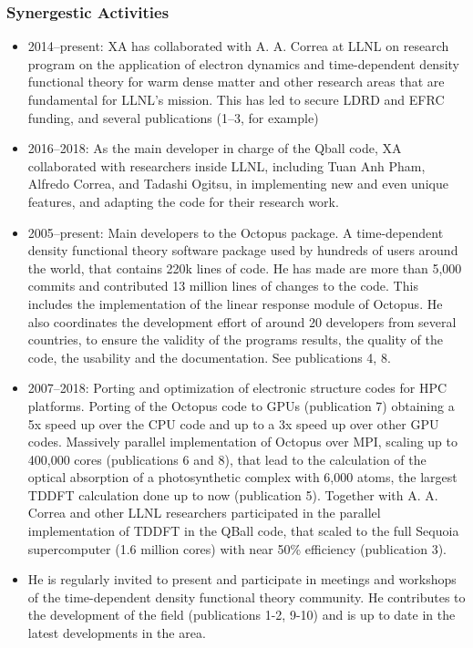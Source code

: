 \subsubsection*{Synergestic Activities}

\begin{itemize}
    \item 2014–present: XA has collaborated with A. A. Correa at LLNL on research program on the application of electron dynamics and time-dependent density functional theory for warm dense matter and other research areas that are fundamental for LLNL’s mission. This has led to secure LDRD and EFRC funding, and several publications (1--3, for example)
    \item 2016–2018: As the main developer in charge of the Qball code, XA collaborated with researchers inside LLNL, including Tuan Anh Pham, Alfredo Correa, and Tadashi Ogitsu, in implementing new and even unique features, and adapting the code for their research work. 
    \item 2005–present: Main developers to the Octopus package. A time-dependent density functional theory software package used by hundreds of users around the world, that contains 220k lines of code. He has made are more than 5,000 commits and contributed 13 million lines of changes to the code. This includes the implementation of the linear response module of Octopus. He also coordinates the development effort of around 20 developers from several countries, to ensure the validity of the programs results, the quality of the code, the usability and the documentation. See publications 4, 8.
    \item 2007–2018: Porting and optimization of electronic structure codes for HPC platforms. Porting of the Octopus code to GPUs (publication 7) obtaining a 5x speed up over the CPU code and up to a 3x speed up over other GPU codes. Massively parallel implementation of Octopus over MPI, scaling up to 400,000 cores (publications 6 and 8), that lead to the calculation of the optical absorption of a photosynthetic complex with 6,000 atoms, the largest TDDFT calculation done up to now (publication 5). Together with A. A. Correa and other LLNL researchers participated in the parallel implementation of TDDFT in the QBall code, that scaled to the full Sequoia supercomputer (1.6 million cores) with near 50\% efficiency (publication 3).
    \item He is regularly invited to present and participate in meetings and workshops of the time-dependent density functional theory community. He contributes to the development of the field (publications 1-2, 9-10) and is up to date in the latest developments in the area.
\end{itemize}
\clearpage

